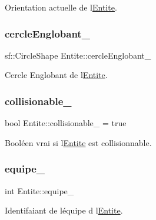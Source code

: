 Orientation actuelle de l\textquotesingle{}\hyperlink{class_entite}{Entite}. 

\mbox{\label{class_entite_a5b6c62e4dc54221a84ce4dc824fdb2da}} 
\subsubsection{\texorpdfstring{cercle\+Englobant\+\_\+}{cercleEnglobant\_}}
{\footnotesize\ttfamily sf\+::\+Circle\+Shape Entite\+::cercle\+Englobant\+\_\+\hspace{0.3cm}{\ttfamily [protected]}}



Cercle Englobant de l\textquotesingle{}\hyperlink{class_entite}{Entite}. 

\mbox{\label{class_entite_a37bb9bd568e9e1c904eaa83ec49a2b16}} 
\subsubsection{\texorpdfstring{collisionable\+\_\+}{collisionable\_}}
{\footnotesize\ttfamily bool Entite\+::collisionable\+\_\+ = true\hspace{0.3cm}{\ttfamily [protected]}}



Booléen vrai si l\textquotesingle{}\hyperlink{class_entite}{Entite} est collisionnable. 

\mbox{\label{class_entite_a86f42758a3e4672052331b7a4daa10b5}} 
\subsubsection{\texorpdfstring{equipe\+\_\+}{equipe\_}}
{\footnotesize\ttfamily int Entite\+::equipe\+\_\+\hspace{0.3cm}{\ttfamily [protected]}}



Identifaiant de l\textquotesingle{}équipe d\textquotesingle{} l\textquotesingle{}\hyperlink{class_entite}{Entite}. 

